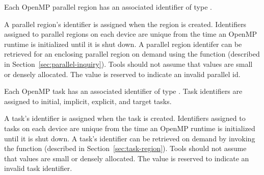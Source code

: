 Each OpenMP parallel region has an associated identifier of type
. 
\begin{comment}
\begin{boxedcode}
typedef uint64\_t ompt\_parallel\_id\_t;
\end{boxedcode}
\end{comment}
\noindent
  A parallel region's identifier is assigned
  when the region is created.  Identifiers assigned to parallel regions on each device are unique from the time an 
  OpenMP runtime is initialized until it is shut down. 
  A parallel region identifer can be retrieved for an enclosing parallel region
  on demand using the function   (described in Section~\ref{sec:parallel-inquiry}).
  Tools should not assume that  values are small or densely allocated.
  The value  is reserved to indicate an invalid parallel id.
 
 
Each OpenMP task has an associated identifier of type
. Task identifiers are assigned to
initial, implicit, explicit, and target tasks.
\begin{comment}
\begin{boxedcode}
typedef uint64\_t ompt\_task\_id\_t;
\end{boxedcode}
\end{comment} 
  A task's identifier is assigned
  when the task is created. 
  Identifiers assigned to tasks on each device are unique from the time an 
  OpenMP runtime is initialized until it is shut down. 
  A task's identifier can be retrieved
  on demand by invoking the   function (described in Section~\ref{sec:task-region}).
  Tools should not assume that  values are small or densely allocated. 
  The value  is reserved to indicate an invalid task identifier.
  
